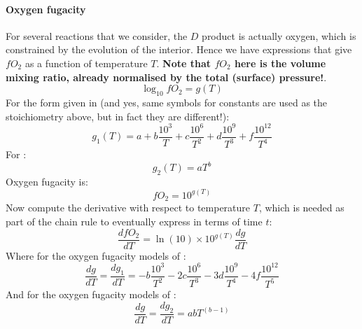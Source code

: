 \paragraph{Oxygen fugacity}
For several reactions that we consider, the $D$ product is actually oxygen, which is constrained by the evolution of the interior.  Hence we have expressions that give $fO_2$ as a function of temperature $T$.  \textbf{Note that $fO_2$ here is the volume mixing ratio, already normalised by the total (surface) pressure!}.
\begin{equation}
\log_{10} fO_2 = g(T)
\end{equation}
For the form given in \cite{SF17} (and yes, same symbols for constants are used as the stoichiometry above, but in fact they are different!):
\begin{equation}
g_1(T) = a + b \frac{10^3}{T} + c \frac{10^6}{T^2} + d \frac{10^9}{T^3} + f \frac{10^{12}}{T^4}
\end{equation}
For \cite{OS19}:
\begin{equation}
g_2(T) = a T^b
\end{equation}
Oxygen fugacity is:
\begin{equation}
fO_2 = 10^{g(T)}
\end{equation}
Now compute the derivative with respect to temperature $T$, which is needed as part of the chain rule to eventually express in terms of time $t$:
\begin{equation}
\frac{d fO_2}{d T} = \ln(10) \times 10^{g(T)} \frac{dg}{dT}
\end{equation}
Where for the oxygen fugacity models of \cite{SF17}:
\begin{equation}
\frac{dg}{dT} = \frac{dg_1}{dT} = -b \frac{10^3}{T^2} - 2c \frac{10^6}{T^3} - 3d \frac{10^9}{T^4} - 4f \frac{10^{12}}{T^5}
\end{equation}
And for the oxygen fugacity models of \cite{OS19}:
\begin{equation}
\frac{dg}{dT} = \frac{dg_2}{dT} = abT^{(b-1)}
\end{equation}
